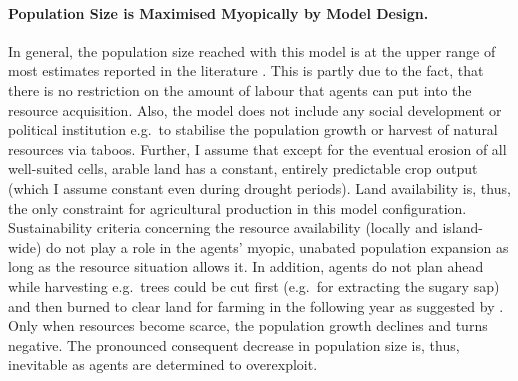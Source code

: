 \paragraph{Population Size is Maximised Myopically by Model Design.}
In general, the population size reached with this model is at the upper range of most estimates reported in the literature \citep{Bahn2017}.
This is partly due to the fact, that there is no restriction on the amount of labour that agents can put into the resource acquisition. 
Also, the model does not include any social development or political institution e.g.\ to stabilise the population growth or harvest of natural resources via taboos.
Further, I assume that except for the eventual erosion of all well-suited cells, arable land has a constant, entirely predictable crop output (which I assume constant even during drought periods). 
Land availability is, thus, the only constraint for agricultural production in this model configuration. 
Sustainability criteria concerning the resource availability (locally and island-wide) do not play a role in the agents' myopic, unabated population expansion as long as the resource situation allows it.
In addition, agents do not plan ahead while harvesting e.g.\ trees could be cut first (e.g.\ for extracting the sugary sap) and then burned to clear land for farming in the following year as suggested by \citet{Mieth2015}.
Only when resources become scarce, the population growth declines and turns negative.
The pronounced consequent decrease in population size is, thus, inevitable as agents are determined to overexploit.

